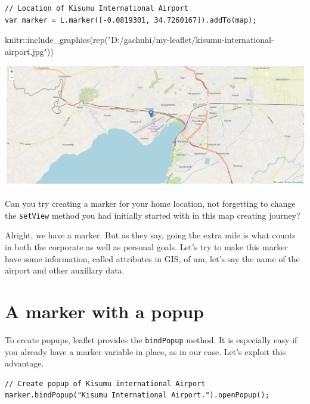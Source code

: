 \documentclass[
]{book}
\newenvironment{Shaded}{\begin{snugshade}}{\end{snugshade}}
\newcommand{\FunctionTok}[1]{\textcolor[rgb]{0.00,0.00,0.00}{#1}}
\newcommand{\NormalTok}[1]{#1}
\newcommand{\SpecialCharTok}[1]{\textcolor[rgb]{0.00,0.00,0.00}{#1}}
\newcommand{\StringTok}[1]{\textcolor[rgb]{0.31,0.60,0.02}{#1}}
\theoremstyle{definition}
\theoremstyle{definition}
\theoremstyle{definition}
\theoremstyle{definition}
\theoremstyle{remark}
\begin{document}
\begin{verbatim}
// Location of Kisumu International Airport
var marker = L.marker([-0.0819301, 34.7260167]).addTo(map);
\end{verbatim}

\begin{Shaded}
\begin{Highlighting}[]
\NormalTok{knitr}\SpecialCharTok{::}\FunctionTok{include\_graphics}\NormalTok{(}\FunctionTok{rep}\NormalTok{(}\StringTok{"D:/gachuhi/my{-}leaflet/kisumu{-}international{-}airport.jpg"}\NormalTok{))}
\end{Highlighting}
\end{Shaded}

\includegraphics[width=26.62in]{../kisumu-international-airport}

Can you try creating a marker for your home location, not forgetting to change the \texttt{setView} method you had initially started with in this map creating journey?

Alright, we have a marker. But as they say, going the extra mile is what counts in both the corporate as well as personal goals. Let's try to make this marker have some information, called attributes in GIS, of um, let's say the name of the airport and other auxillary data.

\hypertarget{a-marker-with-a-popup}{%
\section{A marker with a popup}\label{a-marker-with-a-popup}}

To create popups, leaflet provides the \texttt{bindPopup} method. It is especially easy if you already have a marker variable in place, as in our case. Let's exploit this advantage.

\begin{verbatim}
// Create popup of Kisumu international Airport
marker.bindPopup("Kisumu International Airport.").openPopup();
\end{verbatim}
\end{document}
